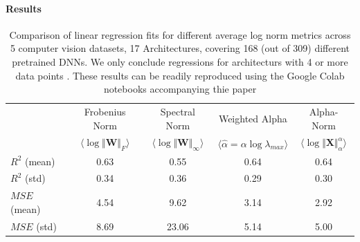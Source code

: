 \paragraph{Results}
\begin{table}[t]
\small
\begin{center}
\begin{tabular}{|p{1in}|c|c|c|c|}
\hline
    & Frobenius Norm & Spectral Norm & Weighted Alpha & Alpha-Norm \\
    & $\langle\log\Vert\mathbf{W}\Vert_{F}\rangle$ & $\langle\log\Vert\mathbf{W}\Vert_{\infty}\rangle$ & $\langle\hat{\alpha}=\alpha\log\lambda_{max}\rangle$ & $\langle\log\Vert\mathbf{X}\Vert^{\alpha}_{\alpha}\rangle$ \\
\hline
$R^{2}$ (mean) & 0.63 &0.55 &0.64 &0.64 \\
$R^{2}$ (std)  & 0.34 &0.36 &0.29 &0.30 \\
\hline
$MSE$ (mean)   & 4.54 &9.62 &3.14 &2.92 \\
$MSE$ (std)    & 8.69 &23.06 &5.14 &5.00 \\
\hline
\end{tabular}
\end{center}
\caption{Comparison of linear regression fits for different average log norm metrics across 5 computer vision datasets, 17 Architectures, covering 168 (out of 309) different pretrained DNNs.  We only conclude regressions for architecturs with 4 or more data points .  These results can be readily reproduced using the Google Colab notebooks accompanying thie paper\cite{notebooks}}
\label{table:results}
\end{table}


